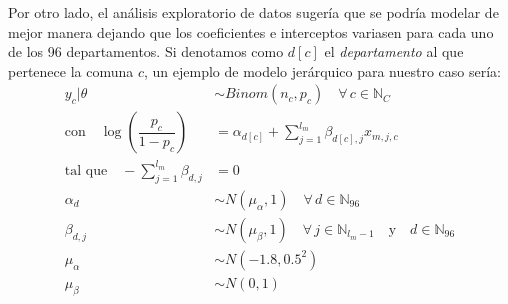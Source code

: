 Por otro lado, el análisis exploratorio de datos sugería que se podría modelar de mejor manera dejando que los coeficientes e interceptos variasen para cada uno de los 96 departamentos. Si denotamos como $d[c]$ el \textit{departamento} al que pertenece la comuna $c$, un ejemplo de modelo jerárquico para nuestro caso sería: 
\begin{align}\label{eq:Modelo_Jer_Ind}
y_c|\theta & \sim Binom(n_c,p_c) \quad \forall \, c \in \mathbb{N}_C \nonumber \\
\text{con} \quad \log\left(\dfrac{p_c}{1-p_c}\right) &= \alpha_{d[c]} + \sum\limits_{j=1}^{l_m} \beta_{d[c],j} x_{m,j,c} \nonumber\\ 
\text{tal que} \quad -\sum\limits_{j = 1}^{l_m} \beta_{d,j} &= 0 \nonumber \\
\alpha_d & \sim N(\mu_{\alpha}, 1) \quad \forall \, d \in \mathbb{N}_{96} \nonumber \\
\beta_{d,j} & \sim N(\mu_{\beta}, 1) \quad \forall \, j \in \mathbb{N}_{l_m-1}  \quad \text{y} \quad d \in \mathbb{N}_{96} \nonumber \\
\mu_{\alpha} &\sim N(-1.8, 0.5^2) \nonumber \\
\mu_{\beta} &\sim N(0,1)
\end{align}

